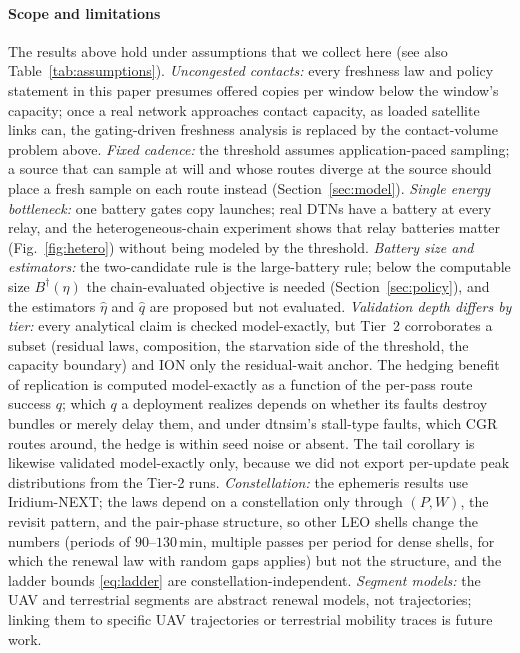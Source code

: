 \documentclass[twocolumn,3p,times,procedia]{elsarticle}
\theoremstyle{plain}
\theoremstyle{remark}
\begin{document}
\paragraph*{Scope and limitations}
The results above hold under assumptions that we collect here (see also
Table~\ref{tab:assumptions}). \emph{Uncongested contacts:} every
freshness law and policy statement in this paper presumes offered
copies per window below the window's capacity; once a real network
approaches contact capacity, as loaded satellite links can, the
gating-driven freshness analysis is replaced by the contact-volume
problem above. \emph{Fixed cadence:} the threshold assumes application-paced
sampling; a source that can sample at will and whose routes diverge at
the source should place a fresh sample on each route instead
(Section~\ref{sec:model}). \emph{Single energy bottleneck:} one battery gates copy
launches; real DTNs have a battery at every relay, and the
heterogeneous-chain experiment shows that relay batteries matter
(Fig.~\ref{fig:hetero}) without being modeled by the threshold.
\emph{Battery size and estimators:} the two-candidate rule is the
large-battery rule; below the computable size $B^{\dagger}(\eta)$ the
chain-evaluated objective is needed (Section~\ref{sec:policy}), and the
estimators $\hat\eta$ and $\hat q$ are proposed but not evaluated.
\emph{Validation depth differs by tier:} every analytical claim is
checked model-exactly, but Tier~2 corroborates a subset (residual laws,
composition, the starvation side of the threshold, the capacity
boundary) and ION only the residual-wait anchor. The hedging benefit of
replication is computed model-exactly as a function of the per-pass
route success $q$; which $q$ a deployment realizes depends on whether
its faults destroy bundles or merely delay them, and under dtnsim's
stall-type faults, which CGR routes around, the hedge is within seed
noise or absent. The tail corollary is
likewise validated model-exactly only, because we did not export
per-update peak distributions from the Tier-2 runs. \emph{Constellation:} the
ephemeris results use Iridium-NEXT; the laws depend on a constellation
only through $(P,W)$, the revisit pattern, and the pair-phase
structure, so other LEO shells change the numbers (periods of
$90$--$130$\,min, multiple passes per period for dense shells, for
which the renewal law with random gaps applies) but not the structure,
and the ladder bounds \eqref{eq:ladder} are constellation-independent.
\emph{Segment models:} the UAV and terrestrial segments are abstract
renewal models, not trajectories; linking them to specific UAV
trajectories or terrestrial mobility traces is future work.
\end{document}
